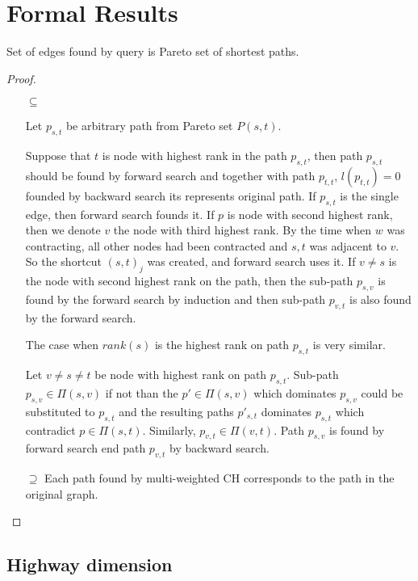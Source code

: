 

\section{Formal Results}
\label{secFormalResults}

\begin{lemma}
Set of edges found by query is Pareto set of shortest paths.
\end{lemma}
\begin{proof}
\begin{itemize}
\item[$\subseteq$] 

Let $p_{s,t}$ be arbitrary path from Pareto set $P(s,t)$. 

Suppose that $t$ is node with highest rank in the path $p_{s,t}$, 
then path $p_{s,t}$ should be found by forward search
and together with path $p_{t,t}$, $l(p_{t,t})=0$ 
founded by backward search its represents original path.
If $p_{s,t}$ is the single edge, then forward search founds it.
If $p$ is node with second highest rank, then we denote $v$ the
node with third highest rank. 
By the time when $w$ was contracting, all other nodes had been contracted
and $s,t$ was adjacent to $v$. So the shortcut $(s,t)_j$ was created, and forward search uses it.
If $v \ne s$ is the node with second highest rank on the path,
then the sub-path $p_{s,v}$ is found by the forward search by induction and
then sub-path $p_{v,t}$ is also found by the forward search.

The case when $rank(s)$ is the highest rank on path $p_{s,t}$ is very similar. 

Let $v \ne s \ne t$ be node with highest rank on path $p_{s,t}$. 
Sub-path $p_{s,v} \in \Pi(s,v)$ 
if not than the $p' \in \Pi(s,v)$ which dominates $p_{s,v}$ could be substituted
to $p_{s,t}$ and the resulting paths $p'_{s,t}$ dominates $p_{s,t}$ which contradict
$p \in \Pi(s,t)$.
Similarly, $p_{v,t} \in \Pi(v,t) $. Path $p_{s,v}$ is found by forward search end path
$p_{v,t}$ by backward search.

\item[$\supseteq$] 
Each path found by multi-weighted CH corresponds to the path in the original graph. 

\end{itemize}
\end{proof}

\subsection{Highway dimension}

